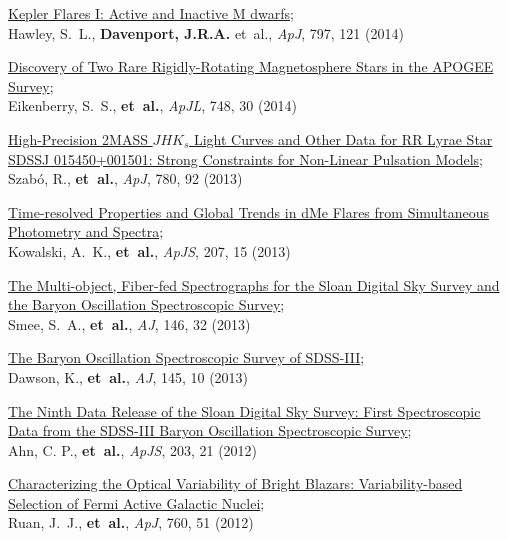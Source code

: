 \documentclass{article}
\begin{document}
\begin{llist}
\begin{etaremune}[leftmargin=10pt]
\item{\sc \href{http://arxiv.org/abs/1410.7779}{\color{NavyBlue}Kepler Flares I: Active and Inactive M dwarfs}};\\
Hawley, S.~L., {\bf Davenport, J.R.A.} et~al., {\em ApJ}, 797, 121 (2014)

\item {\sc \href{http://adsabs.harvard.edu/abs/2014ApJ...784L..30E}{\color{NavyBlue}Discovery of Two Rare Rigidly-Rotating Magnetosphere Stars in the APOGEE Survey}};\\
Eikenberry, S.~S., {\bf et~al.}, {\em ApJL}, 748, 30 (2014)

\item {\sc \href{http://adsabs.harvard.edu/abs/2014ApJ...780...92S}{\color{NavyBlue}High-Precision 2MASS $JHK_s$ Light Curves and Other Data for RR Lyrae Star SDSSJ 015450+001501: Strong Constraints for Non-Linear Pulsation Models}};\\
Szab\'{o}, R., {\bf et~al.}, {\em ApJ}, 780, 92 (2013)

\item{\sc \href{http://adsabs.harvard.edu/abs/2013ApJS..207...15K}{\color{NavyBlue}Time-resolved Properties and Global Trends in dMe Flares from Simultaneous Photometry and Spectra}};\\
Kowalski, A.~K., {\bf et~al.}, {\em ApJS}, 207, 15 (2013)

\item {\sc\href{http://adsabs.harvard.edu/abs/2013AJ....146...32S}{\color{NavyBlue}The Multi-object, Fiber-fed Spectrographs for the Sloan Digital Sky Survey and the Baryon Oscillation Spectroscopic Survey}};\\
Smee, S.~A., {\bf et~al.}, {\em AJ}, 146, 32 (2013)

\item {\sc \href{http://adsabs.harvard.edu/abs/2013AJ....145...10D}{\color{NavyBlue}The Baryon Oscillation Spectroscopic Survey of SDSS-III}};\\
Dawson, K., {\bf et~al.}, {\em AJ}, 145, 10 (2013)

\item {\sc \href{http://adsabs.harvard.edu/abs/2012ApJS..203...21A}{\color{NavyBlue}The Ninth Data Release of the Sloan Digital Sky Survey: First Spectroscopic Data from the SDSS-III Baryon Oscillation Spectroscopic Survey}};\\
Ahn, C. P.,  {\bf et~al.}, {\em ApJS}, 203, 21 (2012)

\item {\sc \href{http://adsabs.harvard.edu/abs/2012ApJ...760...51R}{\color{NavyBlue}Characterizing the Optical Variability of Bright Blazars: Variability-based Selection of Fermi Active Galactic Nuclei}};\\
Ruan, J.~J., {\bf et~al.}, {\em ApJ}, 760, 51 (2012)


\end{etaremune}
\end{llist}
\end{document}
